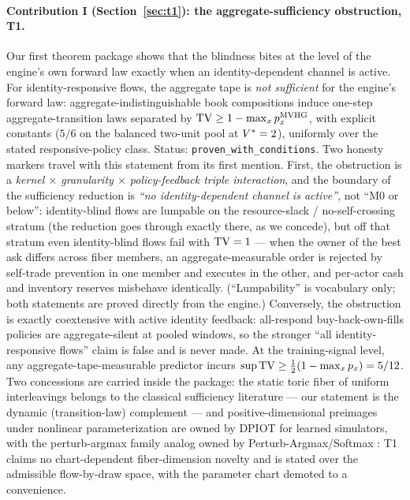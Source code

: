 \paragraph{Contribution I (Section~\ref{sec:t1}): the aggregate-sufficiency
obstruction, T1.}
Our first theorem package shows that the blindness bites at the level of the
engine's own forward law exactly when an identity-dependent channel is
active. For identity-responsive flows, the aggregate tape is \emph{not
sufficient} for the engine's forward law: aggregate-indistinguishable book
compositions induce one-step aggregate-transition laws separated by
$\operatorname{TV} \ge 1 - \max_x p_x^{\operatorname{MVHG}}$, with explicit constants ($5/6$ on the
balanced two-unit pool at $V^{*} = 2$), uniformly over the stated
responsive-policy class. Status: \texttt{proven\_with\_conditions}. Two
honesty markers travel with this statement from its first mention. First,
the obstruction is a \emph{kernel $\times$ granularity $\times$
policy-feedback triple interaction}, and the boundary of the sufficiency
reduction is \emph{``no identity-dependent channel is active''}, not ``M0 or
below'': identity-blind flows are lumpable on the resource-slack /
no-self-crossing stratum (the reduction goes through exactly there, as we
concede), but off that stratum even identity-blind flows fail with
$\operatorname{TV} = 1$ --- when the owner of the best ask differs across fiber members,
an aggregate-measurable order is rejected by self-trade prevention in one
member and executes in the other, and per-actor cash and inventory reserves
misbehave identically. (``Lumpability'' is vocabulary only; both statements
are proved directly from the engine.) Conversely, the obstruction is exactly
coextensive with active identity feedback: all-respond
buy-back-own-fills policies are aggregate-silent at pooled windows, so the
stronger ``all identity-responsive flows'' claim is false and is never made.
At the training-signal level, any aggregate-tape-measurable predictor incurs
$\sup \operatorname{TV} \ge \tfrac{1}{2}(1 - \max_x p_x) = 5/12$. Two concessions are
carried inside the package: the static toric fiber of uniform interleavings
belongs to the classical sufficiency literature --- our statement is the
dynamic (transition-law) complement \citep{diaconissturmfels1998,
fibers2014} --- and positive-dimensional preimages under nonlinear
parameterization are owned by DPIOT for learned simulators, with the
perturb-argmax family analog owned by Perturb-Argmax/Softmax
\citep{dpiot2022,perturbargmax2024}: T1 claims no chart-dependent
fiber-dimension novelty and is stated over the admissible flow-by-draw space,
with the parameter chart demoted to a convenience.

